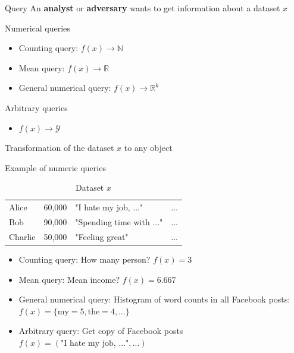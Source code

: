 \documentclass[12pt,aspectratio=169,handout]{beamer}
\begin{document}
\begin{frame}{Query}
An \textbf{analyst} or \textbf{adversary} wants to get information about a dataset $x$

Numerical queries
\begin{itemize}
	\item Counting query: $f(x) \to \mathbb{N}$
	\item Mean query: $f(x) \to \mathbb{R}$
	\item General numerical query: $f(x) \to \mathbb{R}^k$
\end{itemize}
	
Arbitrary queries
\begin{itemize}
	\item $f(x) \to \mathcal{Y}$
\end{itemize}
Transformation of the dataset $x$ to any object
	
\end{frame}


\begin{frame}{Example of numeric queries}
\begin{table}
	\begin{tabular}{lrll}
		\toprule
		Alice & 60,000 & "I hate my job, ..." & ... \\
		Bob & 90,000 & "Spending time with ..." & ...\\
		Charlie & 50,000 & "Feeling great" & ...\\
		\bottomrule
	\end{tabular}
	\caption{Dataset $x$}
\end{table}	

\begin{itemize}
	\item Counting query: How many person? $f(x) = 3$
	\item Mean query: Mean income? $f(x) = 6.667$
	\item General numerical query: Histogram of word counts in all Facebook posts: $f(x) = \{\text{my}= 5, \text{the} = 4, \ldots\}$
	\item Arbitrary query: Get copy of Facebook posts $f(x) = (\text{"I hate my job, ..."}, \ldots)$
\end{itemize}

	
\end{frame}
\end{document}
